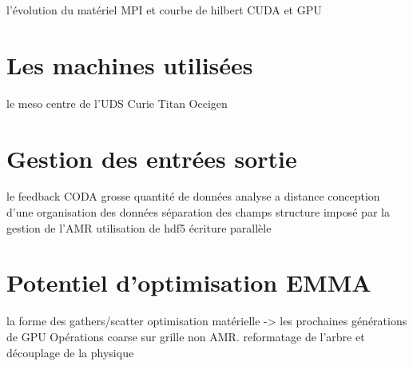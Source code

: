 l'évolution du matériel
MPI et courbe de hilbert
CUDA et GPU

\section{Les machines utilisées}

le meso centre de l'UDS
Curie
Titan
Occigen

\section{Gestion des entrées sortie}

le feedback CODA
grosse quantité de données
analyse a distance
conception d'une organisation des données
séparation des champs
structure imposé par la gestion de l'AMR
utilisation de hdf5
écriture parallèle

\section{Potentiel d'optimisation EMMA}

la forme des gathers/scatter
optimisation matérielle -> les prochaines générations de GPU
Opérations coarse sur grille non AMR.
reformatage de l'arbre et découplage de la physique
